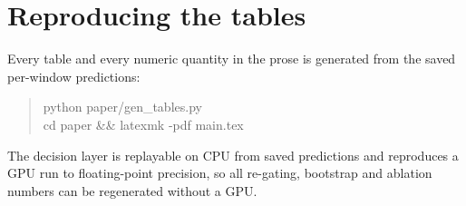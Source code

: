 \documentclass[10pt,twocolumn]{article}
\begin{document}
\section{Reproducing the tables}
\label{app:repro}

Every table and every numeric quantity in the prose is generated from the saved
per-window predictions:

\begin{quote}\footnotesize\ttfamily
python paper/gen\_tables.py\\
cd paper \&\& latexmk -pdf main.tex
\end{quote}

The decision layer is replayable on CPU from saved predictions and reproduces a
GPU run to floating-point precision, so all re-gating, bootstrap and ablation
numbers can be regenerated without a GPU.
\end{document}
